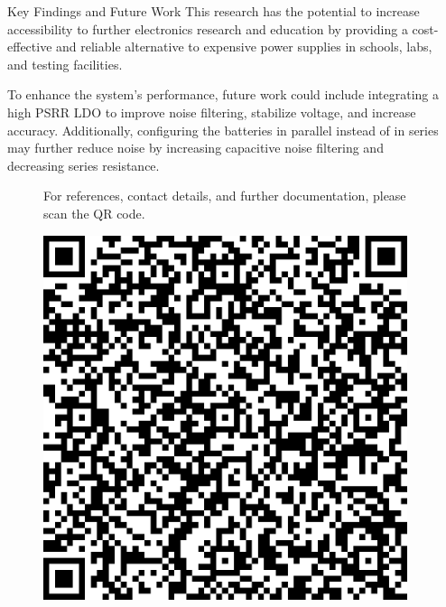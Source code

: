 \documentclass[final]{beamer}
\newlength{\sepwidth}
\newlength{\colwidth}
\newcommand{\separatorcolumn}{\begin{column}{\sepwidth}
\end{column}}
\begin{document}
\begin{frame}[t]
\begin{columns}[t]
\begin{column}{\colwidth}
\begin{block}{Key Findings and Future Work}
					This research has the potential to increase accessibility to further electronics
					research and education by providing a cost-effective and reliable alternative
					to expensive power supplies in schools, labs, and testing facilities.

					To enhance the system's performance, future work could include
					integrating a high PSRR LDO to improve noise filtering, stabilize voltage,
					and increase accuracy. Additionally, configuring the batteries in
					parallel instead of in series may further reduce noise by increasing
					capacitive noise filtering and decreasing series resistance.
				\end{block}

				\begin{figure}
					\begin{flushright}
						\begin{minipage}{1\textwidth}
							\begin{minipage}{0.7\textwidth}
								\raggedright For references, contact details, and further documentation,
								please scan the QR code.
							\end{minipage}
							\hfill
							\begin{minipage}{0.10\textwidth}
								\includegraphics[width=\linewidth]{qrcode.png}
							\end{minipage}
						\end{minipage}
					\end{flushright}
				\end{figure}
			\end{column}

			\separatorcolumn
		\end{columns}
	\end{frame}
\end{document}
